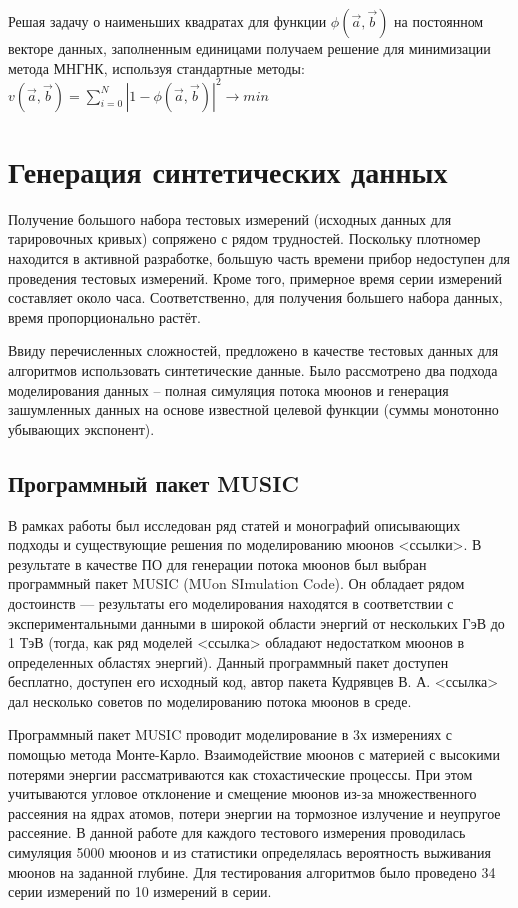 Решая задачу о наименьших квадратах для функции 
$\phi(\vec{a}, \vec{b})$ на постоянном векторе данных, заполненным
единицами получаем решение для минимизации метода МНГНК, используя стандартные методы: 
$v(\vec{a}, \vec{b}) = \displaystyle\sum_{i=0}^N \left|1 -
\phi(\vec{a}, \vec{b})\right|^2 \rightarrow min$


\section{Генерация синтетических данных}\label{sect2_3}


Получение большого набора тестовых измерений (исходных данных 
для тарировочных кривых) сопряжено с рядом трудностей. Поскольку 
плотномер находится в активной разработке,
большую часть времени прибор недоступен для проведения тестовых
измерений. Кроме того, примерное время серии измерений составляет
около часа. Соответственно, для получения большего набора данных, время пропорционально растёт.


Ввиду перечисленных сложностей, предложено в качестве тестовых
данных для алгоритмов использовать синтетические данные. Было 
рассмотрено два подхода моделирования данных -- 
полная симуляция потока мюонов и генерация зашумленных данных 
на основе известной целевой функции (суммы монотонно убывающих экспонент).


\subsection{Программный пакет MUSIC}\label{subsect2_3_1}


В рамках работы был исследован ряд статей и монографий описывающих подходы и существующие
решения по моделированию мюонов <ссылки>. В результате в качестве ПО для 
генерации потока мюонов
был выбран программный пакет MUSIC (MUon SImulation Code). Он обладает
рядом достоинств --- 
результаты его моделирования находятся в соответствии с экспериментальными
данными в широкой области энергий от нескольких ГэВ до 1 ТэВ (тогда, как ряд
моделей <ссылка> обладают
недостатком мюонов в определенных областях энергий). Данный программный 
пакет доступен бесплатно, доступен его исходный код, автор пакета
Кудрявцев В. А. <ссылка> дал несколько 
советов по моделированию потока мюонов в среде.


Программный пакет MUSIC проводит моделирование в 3х измерениях с помощью 
метода Монте-Карло. Взаимодействие мюонов с материей с высокими
потерями энергии рассматриваются как стохастические процессы. При этом учитываются угловое отклонение 
и смещение мюонов из-за множественного рассеяния на ядрах атомов, 
потери энергии на тормозное излучение
и неупругое рассеяние. В данной работе для каждого тестового измерения 
проводилась симуляция 5000 мюонов и из статистики определялась вероятность
выживания мюонов на заданной глубине. 
Для тестирования алгоритмов было проведено 34 серии измерений по 10 измерений в серии. 


